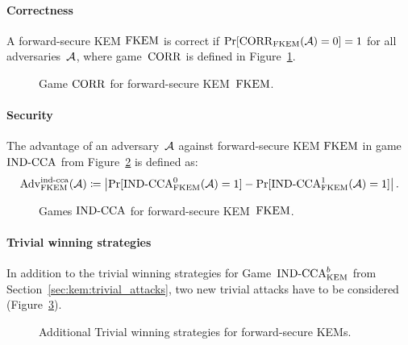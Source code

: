 \paragraph{Correctness} A forward-secure KEM $\mathrm{FKEM}$ is correct if $\Pr[\mathrm{CORR}_{\mathrm{FKEM}}(\mathcal{A})=0]=1$ for all adversaries~$\mathcal{A}$, where game~$\mathrm{CORR}$ is defined in Figure~\ref{fig:fkem:corr}.

\begin{figure}[!ht]
    \centering
    \nicoresetlinenr%
    \fbox{%
        \scalebox{\codescalefactor}{%
        }%
    }
    \caption{%
        Game $\mathrm{CORR}$ for forward-secure KEM~$\mathrm{FKEM}$.
    }
    \label{fig:fkem:corr}
\end{figure}



\paragraph{Security}
The advantage of an adversary~$\mathcal{A}$ against forward-secure KEM $\mathrm{FKEM}$ in game ${\mathrm{IND}\text{-}\mathrm{CCA}}$ from Figure~\ref{fig:fkem:ind} is defined as:
\[
\mathrm{Adv}_{\mathrm{FKEM}}^{\mathrm{ind}\text{-}\mathrm{cca}}(\mathcal{A})\coloneqq\left|\Pr[{\mathrm{IND}\text{-}\mathrm{CCA}}_{\mathrm{FKEM}}^0(\mathcal{A})=1]-\Pr[{\mathrm{IND}\text{-}\mathrm{CCA}}_{\mathrm{FKEM}}^1(\mathcal{A})=1]\right|\text{.}
\]

\begin{figure}[!ht]
    \centering
    \nicoresetlinenr%
    \fbox{%
        \scalebox{\codescalefactor}{%
        }%
    }
    \caption{%
        Games ${\mathrm{IND}\text{-}\mathrm{CCA}}$ for forward-secure KEM~$\mathrm{FKEM}$.
    }
    \label{fig:fkem:ind}
\end{figure}

\paragraph{Trivial winning strategies} In addition to the trivial winning strategies for Game~${\mathrm{IND}\text{-}\mathrm{CCA}}^b_{\mathrm{KEM}}$ from Section~\ref{sec:kem:trivial_attacks}, two new trivial attacks have to be considered (Figure~\ref{fig:fkem:triv}).

\begin{figure}[!ht]%
    \centering
    
    \caption{Additional Trivial winning strategies for forward-secure KEMs.}
    \label{fig:fkem:triv}
\end{figure}
